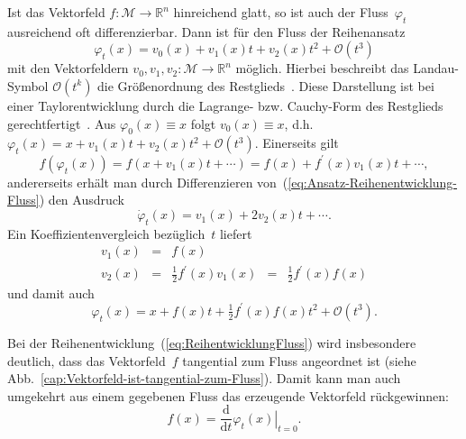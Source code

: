 Ist das Vektorfeld $f:\mathcal{M}\to{\mathbb{R}}^{n}$ hinreichend glatt, so
ist auch der Fluss~$\varphi_{t}$ ausreichend oft differenzierbar.
Dann ist für den Fluss der Reihenansatz
\begin{equation}
\varphi_{t}(x)=v_{0}(x)+v_{1}(x)t+v_{2}(x)t^{2}+\mathcal{O}(t^{3})\label{eq:Ansatz-Reihenentwicklung-Fluss}
\end{equation}
mit den Vektorfeldern $v_{0},v_{1},v_{2}:\mathcal{M}\to{\mathbb{R}}^{n}$ möglich.
Hierbei beschreibt das Landau-Symbol $\mathcal{O}(t^{k})$ die Größenordnung
des Restglieds~\cite[Abschn.~{1.3.1.4}]{zeidler2003}. Diese Darstellung
ist bei einer Taylorentwicklung durch die Lagrange- bzw. Cauchy-Form
des Restglieds gerechtfertigt~\cite{kaballo2000ana1}. Aus $\varphi_{0}(x)\equiv x$
folgt $v_{0}(x)\equiv x$, d.h. $\varphi_{t}(x)=x+v_{1}(x)t+v_{2}(x)t^{2}+\mathcal{O}(t^{3})$.
Einerseits gilt
\[
f(\varphi_{t}(x))=f(x+v_{1}(x)t+\cdots)=f(x)+f^{\prime}(x)v_{1}(x)t+\cdots,
\]
andererseits erhält man durch Differenzieren von~(\ref{eq:Ansatz-Reihenentwicklung-Fluss})
den Ausdruck
\[
\dot{\varphi}_{t}(x)=v_{1}(x)+2v_{2}(x)t+\cdots.
\]
Ein Koeffizientenvergleich bezüglich~$t$ liefert
\[
\begin{array}{lclcl}
v_{1}(x) & = & f(x)\\
v_{2}(x) & = & \tfrac{1}{2} f^{\prime}(x)v_{1}(x) & = & \tfrac{1}{2} f^{\prime}(x)f(x)
\end{array}
\]
und damit auch
\begin{equation}
\varphi_{t}(x)=x+f(x)t+\tfrac{1}{2} f^{\prime}(x)f(x)t^{2}+\mathcal{O}(t^{3}).\label{eq:ReihentwicklungFluss}
\end{equation}

Bei der Reihenentwicklung~(\ref{eq:ReihentwicklungFluss}) wird insbesondere
deutlich, dass das Vektorfeld~$f$ tangential zum Fluss angeordnet
ist (siehe Abb.~\ref{cap:Vektorfeld-ist-tangential-zum-Fluss}).
Damit kann man auch umgekehrt aus einem gegebenen Fluss das erzeugende
Vektor\-feld rückgewinnen:
\begin{equation}
f(x)=\frac{{\mathrm{d}}}{{\mathrm{d}} t}\left.\varphi_{t}(x)\right|_{t=0}.\label{eq:VF-tangential-zum-Fluss}
\end{equation}




